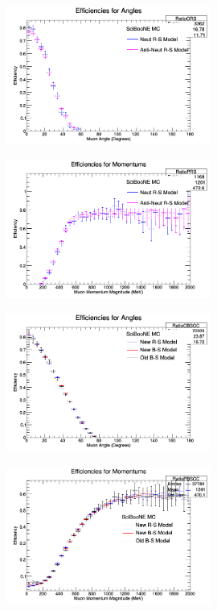 \documentclass[11pt]{article}
\begin{document}
\begin{figure}[H]
\centering
\includegraphics[width=0.6\textwidth]{NMCombinedPlotsImages/20-NMCombinedPlots.png}
\caption{}
\end{figure}

\begin{figure}[H]
\centering
\includegraphics[width=0.6\textwidth]{NMCombinedPlotsImages/21-NMCombinedPlots.png}
\caption{}
\end{figure}

\begin{figure}[H]
\centering
\includegraphics[width=0.6\textwidth]{NMCombinedPlotsImages/22-NMCombinedPlots.png}
\caption{}
\end{figure}

\begin{figure}[H]
\centering
\includegraphics[width=0.6\textwidth]{NMCombinedPlotsImages/23-NMCombinedPlots.png}
\caption{}
\end{figure}
\end{document}
